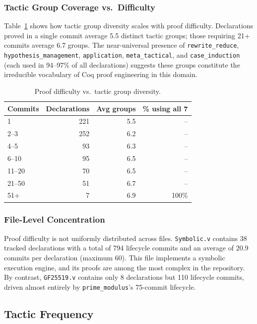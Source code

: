 \documentclass[11pt]{article}
\begin{document}
\subsubsection{Tactic Group Coverage vs.\ Difficulty}

Table~\ref{tab:groups_difficulty} shows how tactic group diversity scales with proof difficulty. Declarations proved in a single commit average 5.5 distinct tactic groups; those requiring 21+ commits average 6.7 groups. The near-universal presence of \texttt{rewrite\_reduce}, \texttt{hypothesis\_management}, \texttt{application}, \texttt{meta\_tactical}, and \texttt{case\_induction} (each used in 94--97\% of all declarations) suggests these groups constitute the irreducible vocabulary of Coq proof engineering in this domain.

\begin{table}[h]
\centering
\caption{Proof difficulty vs.\ tactic group diversity.}
\label{tab:groups_difficulty}
\begin{tabular}{lrrr}
\toprule
Commits & Declarations & Avg groups & \% using all 7 \\
\midrule
1 & 221 & 5.5 & -- \\
2--3 & 252 & 6.2 & -- \\
4--5 & 93 & 6.3 & -- \\
6--10 & 95 & 6.5 & -- \\
11--20 & 70 & 6.5 & -- \\
21--50 & 51 & 6.7 & -- \\
51+ & 7 & 6.9 & 100\% \\
\bottomrule
\end{tabular}
\end{table}

\subsubsection{File-Level Concentration}

Proof difficulty is not uniformly distributed across files. \texttt{Symbolic.v} contains 38 tracked declarations with a total of 794 lifecycle commits and an average of 20.9 commits per declaration (maximum 60). This file implements a symbolic execution engine, and its proofs are among the most complex in the repository. By contrast, \texttt{GF25519.v} contains only 8 declarations but 110 lifecycle commits, driven almost entirely by \texttt{prime\_modulus}'s 75-commit lifecycle.

\subsection{Tactic Frequency}
\end{document}
